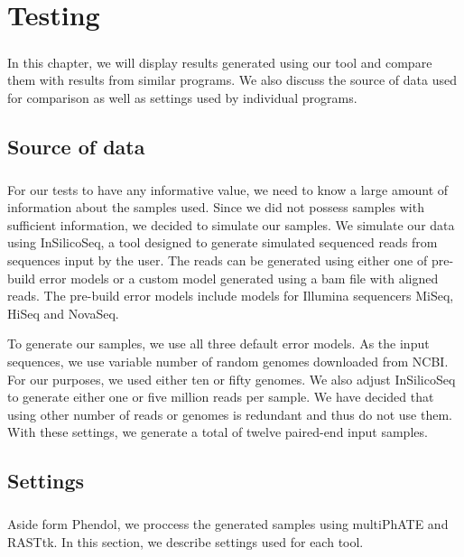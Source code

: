 \chapter{Testing}

\label{kap:testing} %
\paragraph*{}
In this chapter, we will display results generated using our tool and compare them with results from similar programs. We also discuss the source of data used for comparison as well as settings used by individual programs.

\section{Source of data}
\paragraph*{}
For our tests to have any informative value, we need to know a large amount of information about the samples used. Since we did not possess samples with sufficient information, we decided to simulate our samples. We simulate our data using InSilicoSeq, a tool designed to generate simulated sequenced reads from sequences input by the user. The reads can be generated using either one of pre-build error models or a custom model generated using a bam file with aligned reads. The pre-build error models include models for Illumina sequencers MiSeq, HiSeq and NovaSeq.

To generate our samples, we use all three default error models. As the input sequences, we use variable number of random genomes downloaded from NCBI. For our purposes, we used either ten or fifty genomes. We also adjust InSilicoSeq to generate either one or five million reads per sample. We have decided that using other number of reads or genomes is redundant and thus do not use them. With these settings, we generate a total of twelve paired-end input samples.

\section{Settings}
\paragraph*{}
Aside form Phendol, we proccess the generated samples using multiPhATE and RASTtk. In this section, we describe settings used for each tool.

